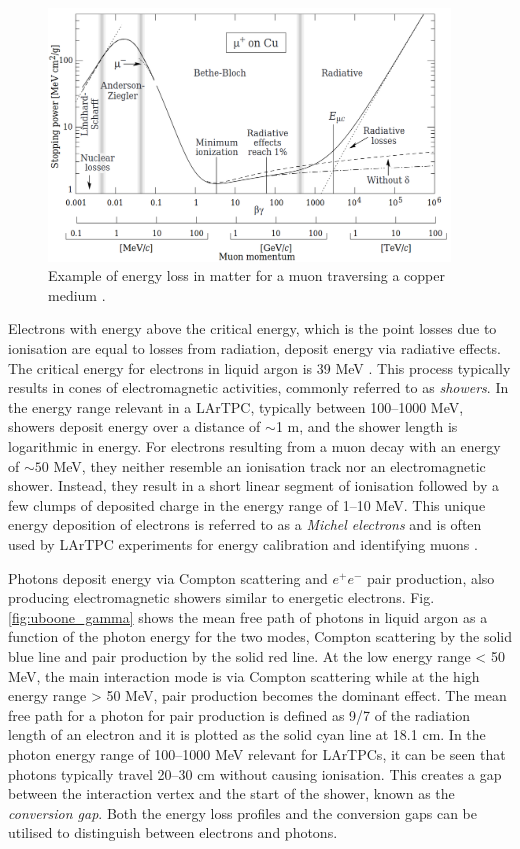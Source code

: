 \begin{figure}[ht!] 
\centering    
\includegraphics[width=0.95\textwidth]{BetheBloch}
\caption[Muon Energy Loss in a Copper Medium]{
Example of energy loss in matter for a muon traversing a copper medium \cite{Passage}.
}
\label{fig:BetheBloch}
\end{figure}

Electrons with energy above the critical energy, which is the point losses due to ionisation are equal to losses from radiation, deposit energy via radiative effects.
The critical energy for electrons in liquid argon is 39 MeV \cite{uboone_gamma}.
This process typically results in cones of electromagnetic activities, commonly referred to as \textit{showers}.
In the energy range relevant in a LArTPC, typically between 100--1000 MeV, showers deposit energy over a distance of $\sim$1 m, and the shower length is logarithmic in energy.
For electrons resulting from a muon decay with an energy of $\sim50$ MeV, they neither resemble an ionisation track nor an electromagnetic shower.
Instead, they result in a short linear segment of ionisation followed by a few clumps of deposited charge in the energy range of 1--10 MeV.
This unique energy deposition of electrons is referred to as a \textit{Michel electrons} and is often used by LArTPC experiments for energy calibration and identifying muons  \cite{uboone_michel}.

Photons deposit energy via Compton scattering and $e^+e^-$ pair production, also producing electromagnetic showers similar to energetic electrons.
Fig. \ref{fig:uboone_gamma} shows the mean free path of photons in liquid argon as a function of the photon energy for the two modes, Compton scattering by the solid blue line and pair production by 
the solid red line.
At the low energy range < 50 MeV, the main interaction mode is via Compton scattering while at the high energy range > 50 MeV, pair production becomes the dominant effect.
The mean free path for a photon for pair production is defined as 9/7 of the radiation length of an electron and it is plotted as the solid cyan line at 18.1 cm.
In the photon energy range of 100--1000 MeV relevant for LArTPCs, it can be seen that photons typically travel 20--30 cm without causing ionisation.
This creates a gap between the interaction vertex and the start of the shower, known as the \textit{conversion gap}.
Both the energy loss profiles and the conversion gaps can be utilised to distinguish between electrons and photons. 

